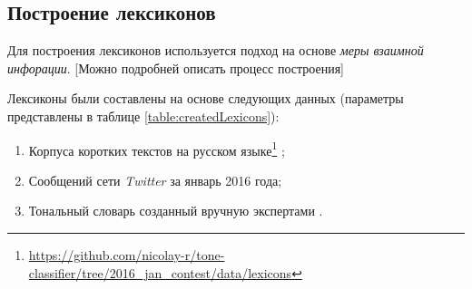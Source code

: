 \subsection{Построение лексиконов}
Для построения лексиконов используется подход на основе {\it меры взаимной
инфорации}\cite{lexiconSO}.
[Можно подробней описать процесс построения]

Лексиконы были составлены на основе следующих данных (параметры представлены
в таблице \ref{table:createdLexicons}):

\begin{enumerate}
    \item Корпуса коротких текстов на русском языке\footnote{
        \url{https://github.com/nicolay-r/tone-classifier/tree/2016_jan_contest/data/lexicons}
    } \cite{rubtsovaCollection};
    \item Сообщений сети {\it Twitter } за январь 2016 года;
    \item Тональный словарь созданный вручную экспертами \cite{expertLexicon}.
\end{enumerate}



